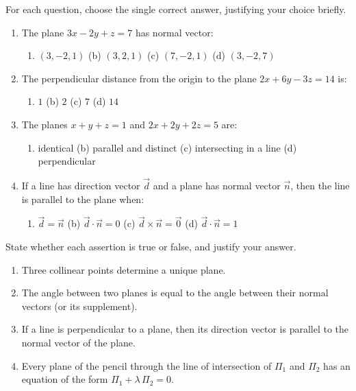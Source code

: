 \documentclass[11pt]{article}
\begin{document}
\begin{exercice}
For each question, choose the single correct answer, justifying your choice briefly.
\begin{enumerate}
\item The plane $3x-2y+z=7$ has normal vector:
\begin{enumerate}
\item $(3,-2,1)$ \quad (b) $(3,2,1)$ \quad (c) $(7,-2,1)$ \quad (d) $(3,-2,7)$
\end{enumerate}
\item The perpendicular distance from the origin to the plane $2x+6y-3z=14$ is:
\begin{enumerate}
\item $1$ \quad (b) $2$ \quad (c) $7$ \quad (d) $14$
\end{enumerate}
\item The planes $x+y+z=1$ and $2x+2y+2z=5$ are:
\begin{enumerate}
\item identical \quad (b) parallel and distinct \quad (c) intersecting in a line \quad (d) perpendicular
\end{enumerate}
\item If a line has direction vector $\vec{d}$ and a plane has normal vector $\vec{n}$, then the line is parallel to the plane when:
\begin{enumerate}
\item $\vec{d}=\vec{n}$ \quad (b) $\vec{d}\cdot\vec{n}=0$ \quad (c) $\vec{d}\times\vec{n}=\vec{0}$ \quad (d) $\vec{d}\cdot\vec{n}=1$
\end{enumerate}
\end{enumerate}
\end{exercice}

\begin{exercice}
State whether each assertion is true or false, and justify your answer.
\begin{enumerate}
\item Three collinear points determine a unique plane.
\item The angle between two planes is equal to the angle between their normal vectors (or its supplement).
\item If a line is perpendicular to a plane, then its direction vector is parallel to the normal vector of the plane.
\item Every plane of the pencil through the line of intersection of $\Pi_1$ and $\Pi_2$ has an equation of the form $\Pi_1+\lambda\,\Pi_2=0$.
\end{enumerate}
\end{exercice}
\end{document}
